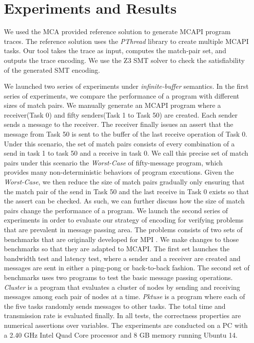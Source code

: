 \section{Experiments and Results}
We used the MCA provided reference solution to generate MCAPI program traces. The reference solution uses the \textit{PThread} library to create multiple MCAPI tasks. Our tool takes the trace as input, computes the match-pair set, and outputs the trace encoding. We use the Z3 SMT solver \cite{demoura:tacas08} to check the satisfiability of the generated SMT encoding.

We launched two series of experiments under \textit{infinite-buffer} semantics. In the first series of experiments, we compare the performance of a program with different sizes of match pairs. We manually generate an MCAPI program where a receiver(Task 0) and fifty senders(Task 1 to Task 50) are created. Each sender sends a message to the receiver. The receiver finally issues an assert that the message from Task 50 is sent to the buffer of the last receive operation of Task 0. Under this scenario, the set of match pairs consists of every combination of a send in task 1 to task 50 and a receive in task 0. We call this precise set of match pairs under this scenario the \textit{Worst-Case} of fifty-message program, which provides many non-deterministic behaviors of program executions. Given the \textit{Worst-Case}, we then reduce the size of match pairs gradually only ensuring that the match pair of the send in Task 50 and the last receive in Task 0 exists so that the assert can be checked. As such, we can further discuss how the size of match pairs change the performance of a program. We launch the second series of experiments in order to evaluate our strategy of encoding for verifying problems that are prevalent in message passing area. The problems consists of two sets of benchmarks that are originally developed for MPI \cite{mpi}. We make changes to those  benchmarks so that they are adapted to MCAPI. The first set \cite{osu_micro_benchmark} launches the bandwidth test and latency test, where a sender and a receiver are created and messages are sent in either a ping-pong or back-to-back fashion. The second set of benchmarks \cite{mpptest_benchmark} uses two programs to test the basic message passing operations. \textit{Cluster} is a program that evaluates a cluster of nodes by sending and receiving messages among each pair of nodes at a time. \textit{Pktuse} is a program where each of the five tasks randomly sends messages to other tasks. The total time and transmission rate is evaluated finally. In all tests, the correctness properties are numerical assertions over variables. The experiments are conducted on a PC with a 2.40 GHz Intel Quad Core processor and 8 GB memory running Ubuntu 14.

